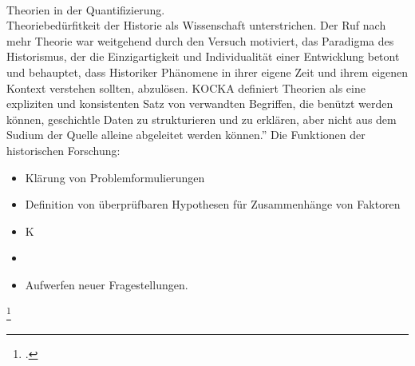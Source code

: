 \documentclass[12pt,a4paper]{article}
\begin{document}
\\
Theorien in der Quantifizierung.
\\
Theoriebedürfitkeit der Historie als Wissenschaft unterstrichen. Der Ruf nach mehr Theorie war weitgehend durch den Versuch motiviert, das Paradigma des Historismus, der die Einzigartigkeit und Individualität einer Entwicklung betont und behauptet, dass Historiker Phänomene in ihrer eigene Zeit und ihrem eigenen Kontext verstehen sollten, abzulösen. KOCKA definiert Theorien als eine expliziten und konsistenten Satz von verwandten Begriffen, die benützt werden können, geschichtle Daten zu strukturieren und zu erklären, aber nicht aus dem Sudium der Quelle alleine abgeleitet werden können.'' Die Funktionen der historischen Forschung:
\begin{itemize}
\item Klärung von Problemformulierungen
\item Definition von überprüfbaren Hypothesen für Zusammenhänge von Faktoren 
\item K
\item 
\item Aufwerfen neuer Fragestellungen.
\end{itemize}
\footcite[][S.182-191]{jarausch1985quantitative}


\end{document}
